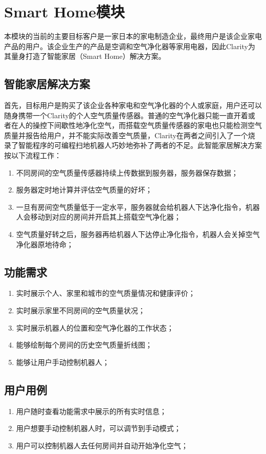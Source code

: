 \section{Smart Home模块}
本模块的当前的主要目标客户是一家日本的家电制造企业，最终用户是该企业家电产品的用户。该企业生产的产品是空调和空气净化器等家用电器，因此Clarity为其量身打造了智能家居（Smart Home）解决方案。
\subsection{智能家居解决方案}
首先，目标用户是购买了该企业各种家电和空气净化器的个人或家庭，用户还可以随身携带一个Clarity的个人空气质量传感器。普通的空气净化器只能一直开着或者在人的操控下间歇性地净化空气，而搭载空气质量传感器的家电也只能检测空气质量并报告给用户，并不能实际改善空气质量，Clarity在两者之间引入了一个烧录了智能程序的可编程扫地机器人巧妙地弥补了两者的不足。此智能家居解决方案按以下流程工作：
\begin{enumerate}
  \item 不同房间的空气质量传感器持续上传数据到服务器，服务器保存数据；
  \item 服务器定时地计算并评估空气质量的好坏；
  \item 一旦有房间空气质量低于一定水平，服务器就会给机器人下达净化指令，机器人会移动到对应的房间并开启其上搭载空气净化器；
  \item 空气质量好转之后，服务器再给机器人下达停止净化指令，机器人会关掉空气净化器原地待命；
\end{enumerate}
\subsection{功能需求}
\begin{enumerate}
  \item 实时展示个人、家里和城市的空气质量情况和健康评价；
  \item 实时展示家里不同房间的空气质量状况；
  \item 实时展示机器人的位置和空气净化器的工作状态；
  \item 能够绘制每个房间的历史空气质量折线图；
  \item 能够让用户手动控制机器人；
\end{enumerate}

\subsection{用户用例}
\begin{enumerate}
  \item 用户随时查看功能需求中展示的所有实时信息；
  \item 用户想要手动控制机器人时，可以调节到手动模式；
  \item 用户可以控制机器人去任何房间并自动开始净化空气；
\end{enumerate}

